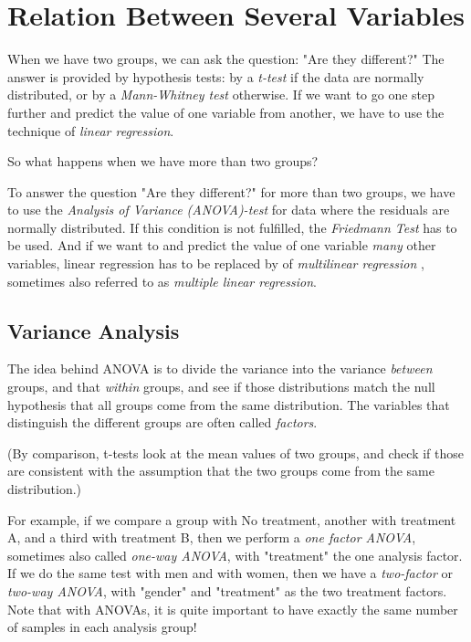 \chapter{Relation Between Several Variables}

When we have two groups, we can ask the question: "Are they different?" The answer is provided by hypothesis tests: by a \emph{t-test} if the data are normally distributed, or by a \emph{Mann-Whitney test} otherwise. If we want to go one step further and predict the value of one variable from another, we have to use the technique of \emph{linear regression}.

So what happens when we have more than two groups?

To answer the question "Are they different?" for more than two groups, we have to use the \emph{Analysis of Variance (ANOVA)-test} for data where the residuals are normally distributed. If this condition is not fulfilled, the \emph{Friedmann Test} has to be used. And if we want to and predict the value of one variable \emph{many} other variables, linear regression has to be replaced by of \emph{multilinear regression} , sometimes also referred to as \emph{multiple linear regression}.

\section{Variance Analysis} \label{sec:anova}  
The idea behind ANOVA is to divide the variance into the variance \emph{between} groups, and that \emph{within} groups, and see if those distributions match the null hypothesis that all groups come from the same distribution. The variables that distinguish the different groups are often called \emph{factors}.

(By comparison, t-tests look at the mean values of two groups, and check if those are consistent with the assumption that the two groups come from the same distribution.)

For example, if we compare a group with No treatment, another with treatment A, and a third with treatment B, then we perform a \emph{one factor ANOVA}, sometimes also called \emph{one-way ANOVA}, with "treatment" the one analysis factor. If we do the same test with men and with women, then we have a \emph{two-factor} or \emph{two-way ANOVA}, with "gender" and "treatment" as the two treatment factors. Note that with ANOVAs, it is quite important to have exactly the same number of samples in each analysis group!

